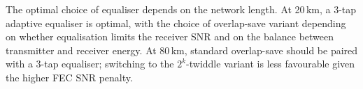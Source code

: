 \documentclass[12pt,a4paper]{article}
\begin{document}
The optimal choice of equaliser depends on the network length. At 20\,km, a 3-tap adaptive equaliser is optimal, with the choice of overlap-save variant depending on whether equalisation limits the receiver SNR and on the balance between transmitter and receiver energy. At 80\,km, standard overlap-save should be paired with a 3-tap equaliser; switching to the $2^k$-twiddle variant is less favourable given the higher FEC SNR penalty.

\printbibliography
\end{document}
